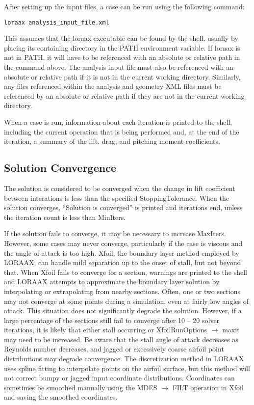 \documentclass[11pt]{article}
\begin{document}
After setting up the input files, a case can be run using the following
command:

\begin{verbatim}
loraax analysis_input_file.xml
\end{verbatim}

\noindent This assumes that the loraax executable can be found by the shell,
usually by placing its containing directory in the PATH environment variable. If
loraax is not in PATH, it will have to be referenced with an absolute or
relative path in the command above. The analysis input file must also be
referenced with an absolute or relative path if it is not in the current working
directory. Similarly, any files referenced within the analysis and geometry XML
files must be referenced by an absolute or relative path if they are not in the
current working directory.

When a case is run, information about each iteration is printed to the shell,
including the current operation that is being performed and, at the end of the
iteration, a summary of the lift, drag, and pitching moment coefficients.

\subsection{Solution Convergence}

The solution is considered to be converged when the change in lift coefficient
between interations is less than the specified StoppingTolerance. When the
solution converges, ``Solution is converged'' is printed and iterations end,
unless the iteration count is less than MinIters.

If the solution fails to converge, it may be necessary to increase MaxIters.
However, some cases may never converge, particularly if the case is viscous and
the angle of attack is too high. Xfoil, the boundary layer method employed by
LORAAX, can handle mild separation up to the onset of stall, but not beyond
that. When Xfoil fails to converge for a section, warnings are printed to the
shell and LORAAX attempts to approximate the boundary layer solution by
interpolating or extrapolating from nearby sections. Often, one or two sections
may not converge at some points during a simulation, even at fairly low angles
of attack. This situation does not significantly degrade the solution. However,
if a large percentage of the sections still fail to converge after 10 -- 20
solver iterations, it is likely that either stall occurring or XfoilRunOptions
$\rightarrow$ maxit may need to be increased. Be aware that the stall angle
of attack decreases as Reynolds number decreases, and jagged or excessively
coarse airfoil point distributions may degrade convergence. The discretization
method in LORAAX uses spline fitting to interpolate points on the airfoil
surface, but this method will not correct bumpy or jagged input
coordinate distributions. Coordinates can sometimes be smoothed manually
using the MDES $\rightarrow$ FILT
operation in Xfoil and saving the smoothed coordinates.
\end{document}

